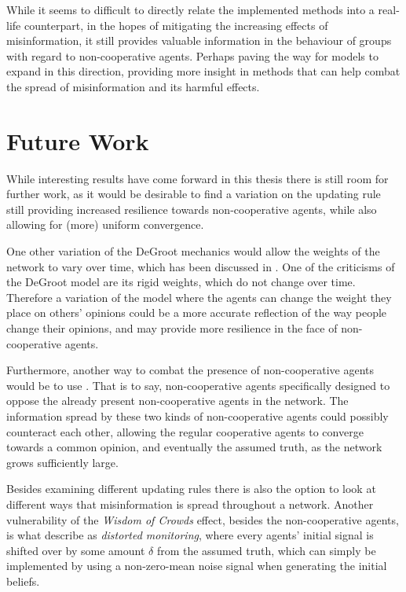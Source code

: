 \documentclass[a4paper, 12pt]{report}
\begin{document}
\noindent While it seems to difficult to directly relate the implemented methods into a real-life counterpart, in the hopes of mitigating the increasing effects of misinformation, it still provides valuable information in the behaviour of groups with regard to non-cooperative agents. Perhaps paving the way for models to expand in this direction, providing more insight in methods that can help combat the spread of misinformation and its harmful effects.

\newpage

\section{Future Work}

While interesting results have come forward in this thesis there is still room for further work, as it would be desirable to find a variation on the updating rule still providing increased resilience towards non-cooperative agents, while also allowing for (more) uniform convergence.

\noindent One other variation of the DeGroot mechanics would allow the weights of the network to vary over time, which has been discussed in \parencite{chatterjee1977stochastic}. One of the criticisms of the DeGroot model are its rigid weights, which do not change over time. Therefore a variation of the model where the agents can change the weight they place on others' opinions could be a more accurate reflection of the way people change their opinions, and may provide more resilience in the face of non-cooperative agents.

\noindent Furthermore, another way to combat the presence of non-cooperative agents would be to use . That is to say, non-cooperative agents specifically designed to oppose the already present non-cooperative agents in the network. The information spread by these two kinds of non-cooperative agents could possibly counteract each other, allowing the regular cooperative agents to converge towards a common opinion, and eventually the assumed truth, as the network grows sufficiently large.

\noindent Besides examining different updating rules there is also the option to look at different ways that misinformation is spread throughout a network. Another vulnerability of the \emph{Wisdom of Crowds} effect, besides the non-cooperative agents, is what \parencite{amir2021robust} describe as \emph{distorted monitoring}, where every agents' initial signal is shifted over by some amount $\delta$ from the assumed truth, which can simply be implemented by using a non-zero-mean noise signal when generating the initial beliefs.
\end{document}
